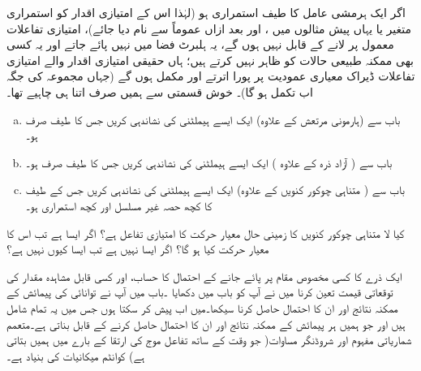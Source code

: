اگر ایک ہرمشی عامل کا طیف استمراری ہو (لہٰذا اس کے امتیازی اقدار کو استمراری متغیر  یا یہاں پیش مثالوں میں ، اور بعد ازاں عموماً  سے نام دیا جائے)، امتیازی تفاعلات معمول پر لانے کے قابل نہیں ہوں گے، یہ ہلبرٹ فضا میں نہیں پائے جاتے اور یہ کسی بھی ممکنہ طبیعی حالات کو ظاہر نہیں کرتے ہیں؛ ہاں حقیقی امتیازی اقدار والے امتیازی تفاعلات ڈیراک معیاری عمودیت پر پورا اترتے اور مکمل ہوں گے (جہاں مجموعہ کی جگہ اب تکمل ہو گا)۔ خوش قسمتی سے ہمیں صرف اتنا ہی چاہیے تھا۔
\begin{enumerate}[a.]
\item
 باب  سے (ہارمونی مرتعش کے علاوہ) ایک ایسے ہیملٹنی کی نشاندہی کریں جس کا طیف صرف  ہو۔ 
\item
باب  سے ( آزاد ذرہ کے علاوہ ) ایک ایسے ہیملٹنی کی نشاندہی کریں جس کا طیف صرف  ہو۔ 
\item
 باب  سے ( متناہی چوکور  کنویں کے علاوہ) ایک ایسے ہیملٹنی کی نشاندہی کریں جس کے طیف کا کچھ حصہ غیر مسلسل اور کچھ استمراری ہو۔ 
\end{enumerate}
کیا لا متناہی چوکور  کنویں کا زمینی حال معیار حرکت کا امتیازی تفاعل ہے؟ اگر ایسا ہے تب اس کا معیار حرکت کیا ہو گا؟ اگر ایسا نہیں ہے تب ایسا کیوں نہیں ہے؟

ایک ذرے کا کسی مخصوص مقام پر پائے جانے کے احتمال کا حساب، اور کسی قابل مشاہدہ مقدار کی توقعاتی قیمت تعین کرنا میں نے آپ کو باب  میں دکھایا ۔باب  میں آپ نے توانائی کی پیمائش کے ممکنہ نتائج اور ان کا احتمال حاصل کرنا سیکھا۔میں اب  پیش کر سکتا ہوں جس میں یہ تمام شامل ہیں اور جو ہمیں ہر پیمائش کے ممکنہ نتائج اور ان کا احتمال حاصل کرنے کے قابل بناتی ہے۔متعمم شماریاتی مفہوم اور شروڈنگر مساوات( جو وقت کے ساتھ تفاعل موج کی ارتقا کے بارے میں ہمیں بتاتی ہے) کوانٹم میکانیات کی بنیاد ہے۔

